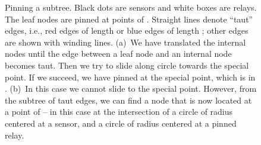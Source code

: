 \documentclass[11pt,a4paper]{article}
\theoremstyle{definition}
\theoremstyle{remark}
\begin{document}
\begin{enumerate}
\begin{figure}[b!]
    \centering
    \caption{Pinning a subtree. Black dots are sensors and white boxes are relays. The leaf nodes are pinned at points of . Straight lines denote ``taut'' edges, i.e., red edges of length  or blue edges of length ; other edges are shown with winding lines. (a)~We have translated the internal nodes until the edge between a leaf node  and an internal node  becomes taut. Then we try to slide  along circle  towards the special point. If we succeed, we have pinned  at the special point, which is in . (b)~In this case we cannot slide  to the special point. However, from the subtree of taut edges, we can find a node  that is now located at a point of  -- in this case at the intersection of a circle of radius  centered at a sensor, and a circle of radius  centered at a pinned relay.}\label{fig:pinsubtree}
\end{figure}


\end{enumerate}
\end{document}

